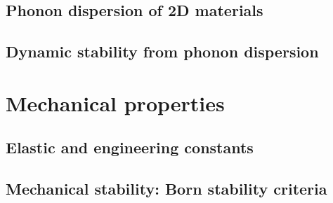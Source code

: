 \subsection{Phonon dispersion of 2D materials}
\subsection{Dynamic stability from phonon dispersion}

\section{Mechanical properties}
\subsection{Elastic and engineering constants}
\subsection{Mechanical stability: Born stability criteria}